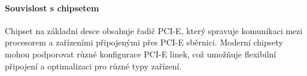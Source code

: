 \paragraph{Souvislost s chipsetem}
Chipset na základní desce obsahuje řadič PCI-E, který spravuje komunikaci mezi procesorem a zařízeními připojenými přes PCI-E sběrnici. Moderní chipsety mohou podporovat různé konfigurace PCI-E linek, což umožňuje flexibilní připojení a optimalizaci pro různé typy zařízení.
